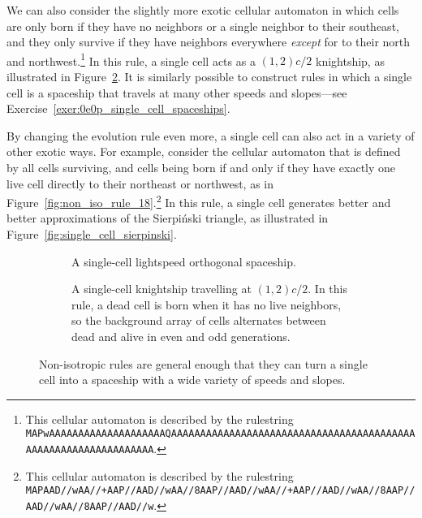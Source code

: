 We can also consider the slightly more exotic cellular automaton in which cells are only born if they have no neighbors or a single neighbor to their southeast, and they only survive if they have neighbors everywhere \emph{except} for to their north and northwest.\footnote{This cellular automaton is described by the rulestring\protect\\\texttt{MAPwAAAAAAAAAAAAAAAAAAAAQAAAAAAAAAAAAAAAAAAAAAAAAAAAAAAAAAAAAAAAAAAAAAAAAAAAAAAAAAAAAAAAA}.} In this rule, a single cell acts as a $(1,2)c/2$ knightship, as illustrated in Figure~\ref{fig:single_cell_knightship}. It is similarly possible to construct rules in which a single cell is a spaceship that travels at many other speeds and slopes---see Exercise~\ref{exer:0e0p_single_cell_spaceships}.

By changing the evolution rule even more, a single cell can also act in a variety of other exotic ways. For example, consider the cellular automaton that is defined by all cells surviving, and cells being born if and only if they have exactly one live cell directly to their northeast or northwest, as in Figure~\ref{fig:non_iso_rule_18}.\footnote{This cellular automaton is described by the rulestring\protect\\\texttt{MAPAAD//wAA//+AAP//AAD//wAA//8AAP//AAD//wAA//+AAP//AAD//wAA//8AAP//AAD//wAA//8AAP//AAD//w}.} In this rule, a single cell generates better and better approximations of the Sierpi\'{n}ski triangle, as illustrated in Figure~\ref{fig:single_cell_sierpinski}.

\begin{figure}[!htb]
	\centering
	\begin{subfigure}{.32\textwidth}
		\centering
		\caption{A single-cell lightspeed orthogonal spaceship.}
		\label{fig:single_cell_orth}
		\begin{minipage}{.1cm}
			\vfill
		\end{minipage}
	\end{subfigure} \hfill %
	\begin{subfigure}{.65\textwidth}
		\centering
		\caption{A single-cell knightship travelling at $(1,2)c/2$. In this rule, a dead cell is born when it has no live neighbors, so the background array of cells alternates between dead and alive in even and odd generations.}
		\label{fig:single_cell_knightship}
	\end{subfigure}
	\caption{Non-isotropic rules are general enough that they can turn a single cell into a spaceship with a wide variety of speeds and slopes.}\label{fig:single_cell_spaceships}
\end{figure}

